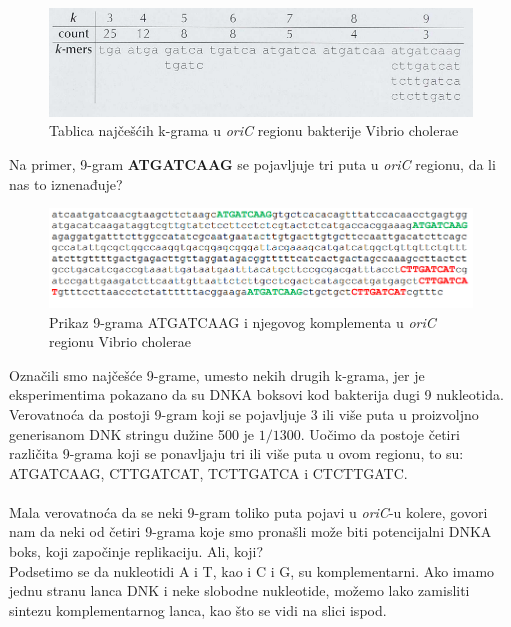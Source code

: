 \begin{figure}[h]
\caption{Tablica najčešćih k-grama u \textit{oriC} regionu bakterije Vibrio cholerae}
\centering
\includegraphics[width=1\textwidth]{poglavlja/1/slike/Tablica_VC.png}
\end{figure} 

Na primer, 9-gram \textbf{ATGATCAAG} se pojavljuje tri puta u \textit{oriC} regionu, da li nas to iznenađuje?

\begin{figure}[h]
\caption{Prikaz 9-grama ATGATCAAG i njegovog komplementa u \textit{oriC} regionu Vibrio cholerae}
\centering
\includegraphics[width=1\textwidth]{poglavlja/1/slike/9_VC.png}
\end{figure} 

Označili smo najčešće 9-grame, umesto nekih drugih k-grama, jer je eksperimentima pokazano da su DNKA boksovi kod bakterija dugi 9 nukleotida. Verovatnoća da postoji 9-gram koji se pojavljuje 3 ili više puta u proizvoljno generisanom DNK stringu dužine 500 je $1/1300$. Uočimo da postoje četiri različita 9-grama koji se ponavljaju tri ili više puta u ovom regionu, to su: ATGATCAAG, CTTGATCAT, TCTTGATCA i CTCTTGATC.\\\\

Mala verovatnoća da se neki 9-gram toliko puta pojavi u \textit{oriC}-u kolere, govori nam da neki od četiri 9-grama koje smo pronašli može biti potencijalni DNKA boks, koji započinje replikaciju. Ali, koji?\\

Podsetimo se da nukleotidi A i T, kao i C i G, su komplementarni. Ako imamo jednu stranu lanca DNK i neke slobodne nukleotide, možemo lako zamisliti sintezu komplementarnog lanca, kao što se vidi na slici ispod. 

